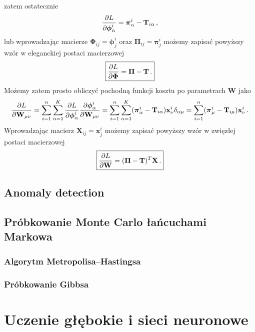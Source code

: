 \documentclass{myclass}
\numberwithin{equation}{section}
\begin{document}
zatem ostatecznie
\begin{equation}
    \pdv{L}{\boldsymbol{\phi}_\alpha^i} = \boldsymbol{\pi}_\alpha^i - \mathbf{T}_{i\alpha}\,,
\end{equation}
lub wprowadzając macierze \(\boldsymbol{\Phi}_{ij} = \boldsymbol{\phi}^i_j\) oraz
\(\boldsymbol{\Pi}_{ij} = \boldsymbol{\pi}^i_j\) możemy zapisać powyższy wzór w eleganckiej postaci
macierzowej
\begin{equation}\boxed{
    \pdv{L}{\boldsymbol{\Phi}} = \boldsymbol{\Pi} - \mathbf{T}\,.
}\end{equation}
Możemy zatem prosto obliczyć pochodną funkcji kosztu po parametrach \(\mathbf{W}\) jako
\begin{equation}
    \pdv{L}{\mathbf{W}_{\mu\nu}} = \sum_{i=1}^n \sum_{\alpha=1}^{K} \pdv{L}{\boldsymbol{\phi}_\alpha^i}\pdv{\boldsymbol{\phi}_\alpha^i}{\mathbf{W}_{\mu\nu}} = \sum_{i=1}^n \sum_{\alpha=1}^{K} (\boldsymbol{\pi}_\alpha^i - \mathbf{T}_{i\alpha}) \mathbf{x}^i_\nu \delta_{\alpha \mu} = \sum_{i=1}^n (\boldsymbol{\pi}_\mu^i - \mathbf{T}_{i\mu})\mathbf{x}^i_\nu\,.
\end{equation}
Wprowadzając macierz \(\mathbf{X}_{ij} = \mathbf{x}^i_j\) możemy zapisać powyższy wzór w zwięzłej
postaci macierzowej
\begin{equation}\boxed{
    \pdv{L}{\mathbf{W}} = (\boldsymbol{\Pi} - \mathbf{T})^T \mathbf{X}\,.
}\end{equation}



\subsection{Anomaly detection}


\subsection{Próbkowanie Monte Carlo łańcuchami Markowa}

\subsubsection{Algorytm Metropolisa--Hastingsa}

\subsubsection{Próbkowanie Gibbsa}



\section{Uczenie głębokie i sieci neuronowe}

    
\end{document}
